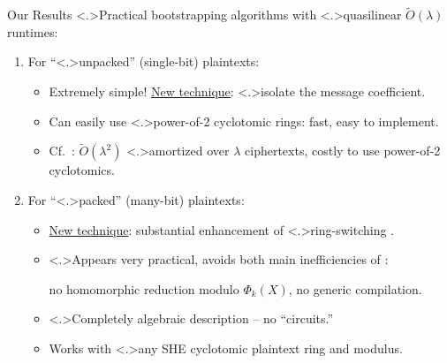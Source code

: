 \documentclass[shadow,xcolor=pdftex,svgnames,table,t]{beamer}
\begin{document}
\begin{frame}[label=results]{Our Results}
  \onslide<+->
  \alert<.>{Practical} bootstrapping algorithms with
  \alert<.>{quasilinear} $\tilde{O}(\lambda)$ runtimes:

  \begin{enumerate}
  \item<+-> For ``\alert<.>{unpacked}'' (single-bit) plaintexts:

    \begin{itemize}
    \item[\GreenCheck] Extremely simple!  \uline{New technique}:
      \alert<.>{isolate} the message coefficient.
      
      \medskip
    \item<+->[\GreenCheck] Can easily use \alert<.>{power-of-2
        cyclotomic rings}: fast, easy to implement.

      \medskip
    \item<+-> Cf.~{\citationsize [BGV'12]}: $\tilde{O}(\lambda^2)$
      \alert<.>{amortized} over $\lambda$ ciphertexts, costly to use
      power-of-2 cyclotomics.
    \end{itemize}

    \medskip
  \item<+-> For ``\alert<.>{packed}'' (many-bit) plaintexts:

    \begin{itemize}
    \item<+-> \uline{New technique}: substantial enhancement of
      \alert<.>{ring-switching} {\citationsize [GHPS'12]}.

      \medskip
    \item<+->[\GreenCheck] \alert<.>{Appears very practical}, avoids
      both main inefficiencies of {\citationsize [GHS'12b]}:

      no homomorphic reduction modulo $\Phi_{k}(X)$, no generic
      compilation.

      \medskip
    \item<+->[\GreenCheck] \alert<.>{Completely algebraic description}
      -- no ``circuits.''

      \medskip
    \item<+->[\GreenCheck] Works with \alert<.>{any} SHE cyclotomic
      plaintext ring and modulus.

    \end{itemize}
  \end{enumerate}
\end{frame}
\end{document}
